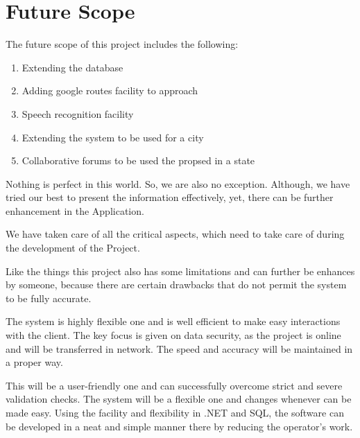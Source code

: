 \documentclass[12pt]{report}
\begin{document}
\section{Future Scope}
The future scope of this project includes the following:
\begin{enumerate}
\item Extending the database
\item Adding google routes facility to approach
\item Speech recognition facility
\item Extending the system to be used for a city
\item Collaborative forums to be used the propsed in a state
\end{enumerate}
Nothing is perfect in this world. So, we are also no exception. Although, we have tried our best to present the information effectively, yet, there can be further enhancement in the Application.

We have taken care of all the critical aspects, which need to take care of during the development of the Project.

Like the things this project also has some limitations and can further be enhances by someone, because there are certain drawbacks that do not permit the system to be fully accurate.

The system is highly flexible one and is well efficient to make easy interactions with the client. The key focus is given on data security, as the project is online and will be transferred in network. The speed and accuracy will be maintained in a proper way.

This will be a user-friendly one and can successfully overcome strict and severe validation checks. The system will be a flexible one and changes whenever can be made easy. Using the facility and flexibility in .NET and SQL, the software can be developed in a neat and simple manner there by reducing the operator’s work.



 
\end{document}
